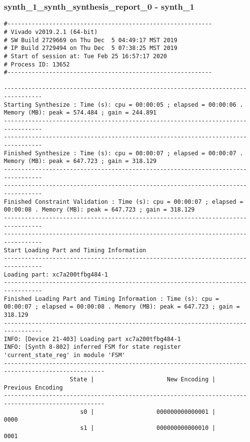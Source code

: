 \documentclass [a4paper, 12pt]{article}
\begin{document}
\subsubsection{synth\_1\_synth\_synthesis\_report\_0 - synth\_1}
\begin{lstlisting}[breaklines, basicstyle=\tiny]
#-----------------------------------------------------------
# Vivado v2019.2.1 (64-bit)
# SW Build 2729669 on Thu Dec  5 04:49:17 MST 2019
# IP Build 2729494 on Thu Dec  5 07:38:25 MST 2019
# Start of session at: Tue Feb 25 16:57:17 2020
# Process ID: 13652
#-----------------------------------------------------------

---------------------------------------------------------------------------------
Starting Synthesize : Time (s): cpu = 00:00:05 ; elapsed = 00:00:06 . Memory (MB): peak = 574.484 ; gain = 244.891
---------------------------------------------------------------------------------
---------------------------------------------------------------------------------
Finished Synthesize : Time (s): cpu = 00:00:07 ; elapsed = 00:00:07 . Memory (MB): peak = 647.723 ; gain = 318.129
---------------------------------------------------------------------------------
---------------------------------------------------------------------------------
Finished Constraint Validation : Time (s): cpu = 00:00:07 ; elapsed = 00:00:08 . Memory (MB): peak = 647.723 ; gain = 318.129
---------------------------------------------------------------------------------
---------------------------------------------------------------------------------
Start Loading Part and Timing Information
---------------------------------------------------------------------------------
Loading part: xc7a200tfbg484-1
---------------------------------------------------------------------------------
Finished Loading Part and Timing Information : Time (s): cpu = 00:00:07 ; elapsed = 00:00:08 . Memory (MB): peak = 647.723 ; gain = 318.129
---------------------------------------------------------------------------------
INFO: [Device 21-403] Loading part xc7a200tfbg484-1
INFO: [Synth 8-802] inferred FSM for state register 'current_state_reg' in module 'FSM'
---------------------------------------------------------------------------------------------------
                   State |                     New Encoding |                Previous Encoding 
---------------------------------------------------------------------------------------------------
                      s0 |                  000000000000001 |                             0000
                      s1 |                  000000000000010 |                             0001

\end{lstlisting}
\end{document}
